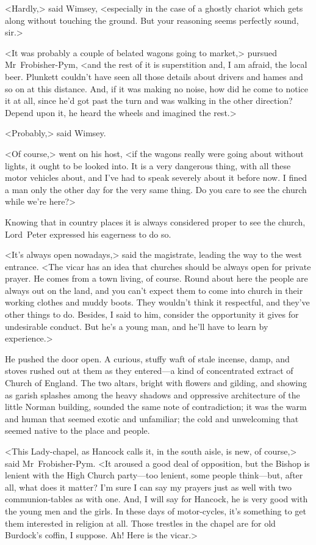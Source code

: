 <Hardly,> said Wimsey, <especially in the case of a ghostly chariot which gets along without touching the ground. But your reasoning seems perfectly sound, sir.>

<It was probably a couple of belated wagons going to market,> pursued Mr~Frobisher-Pym, <and the rest of it is superstition and, I am afraid, the local beer. Plunkett couldn't have seen all those details about drivers and hames and so on at this distance. And, if it was making no noise, how did he come to notice it at all, since he'd got past the turn and was walking in the other direction? Depend upon it, he heard the wheels and imagined the rest.>

<Probably,> said Wimsey.

<Of course,> went on his host, <if the wagons really were going about without lights, it ought to be looked into. It is a very dangerous thing, with all these motor vehicles about, and I've had to speak severely about it before now. I fined a man only the other day for the very same thing. Do you care to see the church while we're here?>

Knowing that in country places it is always considered proper to see the church, Lord~Peter expressed his eagerness to do so.

<It's always open nowadays,> said the magistrate, leading the way to the west entrance. <The vicar has an idea that churches should be always open for private prayer. He comes from a town living, of course. Round about here the people are always out on the land, and you can't expect them to come into church in their working clothes and muddy boots. They wouldn't think it respectful, and they've other things to do. Besides, I said to him, consider the opportunity it gives for undesirable conduct. But he's a young man, and he'll have to learn by experience.>

He pushed the door open. A curious, stuffy waft of stale incense, damp, and stoves rushed out at them as they entered—a kind of concentrated extract of Church of England. The two altars, bright with flowers and gilding, and showing as garish splashes among the heavy shadows and oppressive architecture of the little Norman building, sounded the same note of contradiction; it was the warm and human that seemed exotic and unfamiliar; the cold and unwelcoming that seemed native to the place and people.

<This Lady-chapel, as Hancock calls it, in the south aisle, is new, of course,> said Mr~Frobisher-Pym. <It aroused a good deal of opposition, but the Bishop is lenient with the High Church party—too lenient, some people think—but, after all, what does it matter? I'm sure I can say my prayers just as well with two communion-tables as with one. And, I will say for Hancock, he is very good with the young men and the girls. In these days of motor-cycles, it's something to get them interested in religion at all. Those trestles in the chapel are for old Burdock's coffin, I suppose. Ah! Here is the vicar.>

